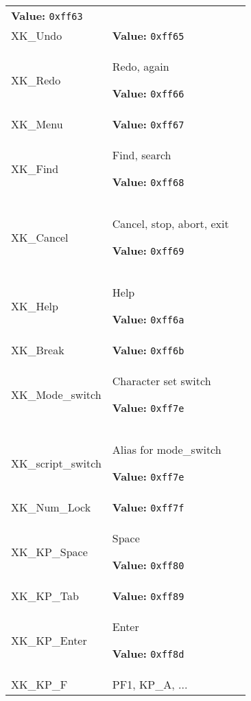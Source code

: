 \begin{longtable}{|p{\varnamewidth}|p{\vardescrwidth}|l}
\textbf{Value:} 
{\tt 0xff63}&\\
\cline{1-2}
\raggedright X\-K\-\_\-U\-n\-d\-o\- & \raggedright \textbf{Value:} 
{\tt 0xff65}&\\
\cline{1-2}
\raggedright X\-K\-\_\-R\-e\-d\-o\- & \raggedright Redo, again

\textbf{Value:} 
{\tt 0xff66}&\\
\cline{1-2}
\raggedright X\-K\-\_\-M\-e\-n\-u\- & \raggedright \textbf{Value:} 
{\tt 0xff67}&\\
\cline{1-2}
\raggedright X\-K\-\_\-F\-i\-n\-d\- & \raggedright Find, search

\textbf{Value:} 
{\tt 0xff68}&\\
\cline{1-2}
\raggedright X\-K\-\_\-C\-a\-n\-c\-e\-l\- & \raggedright Cancel, stop, abort, exit

\textbf{Value:} 
{\tt 0xff69}&\\
\cline{1-2}
\raggedright X\-K\-\_\-H\-e\-l\-p\- & \raggedright Help

\textbf{Value:} 
{\tt 0xff6a}&\\
\cline{1-2}
\raggedright X\-K\-\_\-B\-r\-e\-a\-k\- & \raggedright \textbf{Value:} 
{\tt 0xff6b}&\\
\cline{1-2}
\raggedright X\-K\-\_\-M\-o\-d\-e\-\_\-s\-w\-i\-t\-c\-h\- & \raggedright Character set switch

\textbf{Value:} 
{\tt 0xff7e}&\\
\cline{1-2}
\raggedright X\-K\-\_\-s\-c\-r\-i\-p\-t\-\_\-s\-w\-i\-t\-c\-h\- & \raggedright Alias for mode\_switch

\textbf{Value:} 
{\tt 0xff7e}&\\
\cline{1-2}
\raggedright X\-K\-\_\-N\-u\-m\-\_\-L\-o\-c\-k\- & \raggedright \textbf{Value:} 
{\tt 0xff7f}&\\
\cline{1-2}
\raggedright X\-K\-\_\-K\-P\-\_\-S\-p\-a\-c\-e\- & \raggedright Space

\textbf{Value:} 
{\tt 0xff80}&\\
\cline{1-2}
\raggedright X\-K\-\_\-K\-P\-\_\-T\-a\-b\- & \raggedright \textbf{Value:} 
{\tt 0xff89}&\\
\cline{1-2}
\raggedright X\-K\-\_\-K\-P\-\_\-E\-n\-t\-e\-r\- & \raggedright Enter

\textbf{Value:} 
{\tt 0xff8d}&\\
\cline{1-2}
\raggedright X\-K\-\_\-K\-P\-\_\-F\-1\- & \raggedright PF1, KP\_A, ...


\end{longtable}
